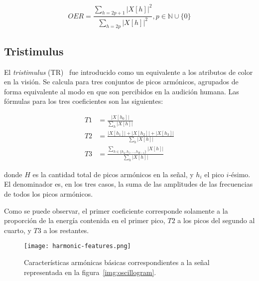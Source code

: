 \begin{equation}
    OER = \frac{\sum_{h=2p+1}{|X[h]|^2}}{\sum_{h=2p}{|X[h]|^2}}, p\in\mathbb{N}\cup \{ 0 \}
\end{equation}

\subsection{Tristimulus}\label{subsec:tristimulus}

El \textit{tristimulus} (TR)~\cite{Gunasekaran11,Peters04} fue introducido como un equivalente a los atributos de color en la visión.
Se calcula para tres conjuntos de picos armónicos, agrupados de forma equivalente al modo en que son percibidos en la audición humana.
Las fórmulas para los tres coeficientes son las siguientes:

\begin{equation}
    \begin{aligned}
        T1 & = \frac{|X[h_0]|}{\sum_{h}{|X[h]|}} \\
        T2 & = \frac{|X[h_1]|+|X[h_2]|+|X[h_3]|}{\sum_{h}{|X[h]|}} \\
        T3 & = \frac{\sum_{h\in \{h_4, h_5, \ldots, h_{H-1}\}}{|X[h]|}}{\sum_{h}{|X[h]|}}
    \end{aligned}
\end{equation}

\noindent
donde $H$ es la cantidad total de picos armónicos en la señal, y $h_i$ el pico $i$-ésimo.
El denominador es, en los tres casos, la suma de las amplitudes de las frecuencias de todos los picos armónicos.

Como se puede observar, el primer coeficiente corresponde solamente a la proporción de la energía contenida en el primer pico, $T2$ a los picos del segundo al cuarto, y $T3$ a los restantes.

\begin{figure}[!h]
    \centering
    \texttt{[image: harmonic-features.png]}
    \caption{Características armónicas básicas correspondientes a la señal representada en la figura~\ref{img:oscillogram}.}
    \label{img:harmonic-features}
\end{figure}
